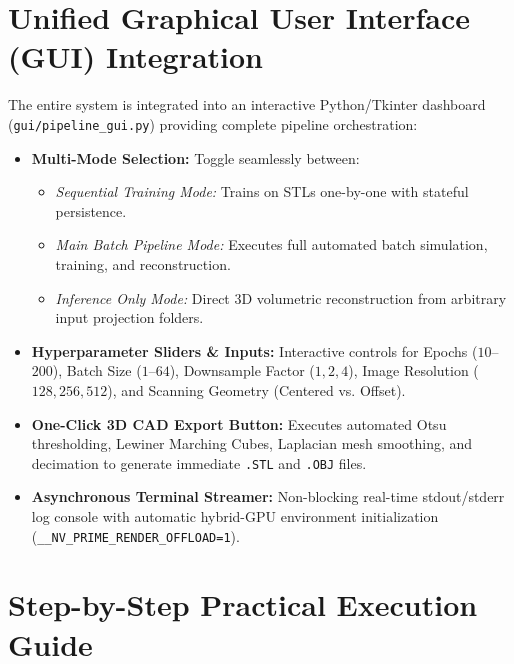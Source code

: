 \documentclass[10pt,a4paper]{article}
\begin{document}
\vspace{-2pt}
\section{Unified Graphical User Interface (GUI) Integration}

The entire system is integrated into an interactive Python/Tkinter dashboard (\texttt{gui/pipeline\_gui.py}) providing complete pipeline orchestration:

\begin{center}
\begin{tcolorbox}[colback=white, colframe=navyblue, title=\textbf{Graphical User Interface (GUI) Feature Matrix}]
\small
\begin{itemize}[leftmargin=*,noitemsep]
    \item \textbf{Multi-Mode Selection:} Toggle seamlessly between:
    \begin{itemize}[noitemsep]
        \item \textit{Sequential Training Mode:} Trains on STLs one-by-one with stateful persistence.
        \item \textit{Main Batch Pipeline Mode:} Executes full automated batch simulation, training, and reconstruction.
        \item \textit{Inference Only Mode:} Direct 3D volumetric reconstruction from arbitrary input projection folders.
    \end{itemize}
    \item \textbf{Hyperparameter Sliders \& Inputs:} Interactive controls for Epochs ($10$–$200$), Batch Size ($1$–$64$), Downsample Factor ($1, 2, 4$), Image Resolution ($128, 256, 512$), and Scanning Geometry (Centered vs. Offset).
    \item \textbf{One-Click 3D CAD Export Button:} Executes automated Otsu thresholding, Lewiner Marching Cubes, Laplacian mesh smoothing, and decimation to generate immediate \texttt{.STL} and \texttt{.OBJ} files.
    \item \textbf{Asynchronous Terminal Streamer:} Non-blocking real-time stdout/stderr log console with automatic hybrid-GPU environment initialization (\texttt{\_\_NV\_PRIME\_RENDER\_OFFLOAD=1}).
\end{itemize}
\end{tcolorbox}
\end{center}

\vspace{-2pt}
\section{Step-by-Step Practical Execution Guide}
\end{document}
